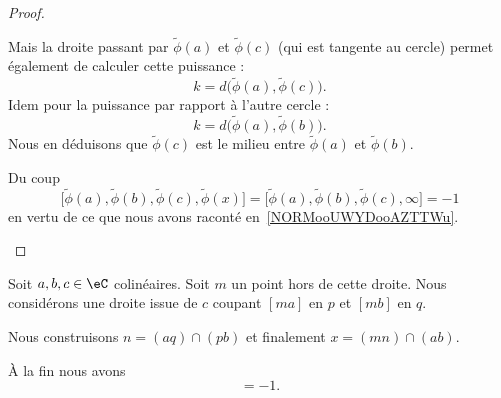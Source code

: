 \begin{proof}
\begin{subproof}
            Mais la droite passant par \( \tilde \phi(a)\) et \( \tilde \phi(c)\) (qui est tangente au cercle) permet également de calculer cette puissance :
            \begin{equation}
                k=d\big( \tilde \phi(a),\tilde \phi(c) \big).
            \end{equation}
            Idem pour la puissance par rapport à l'autre cercle :
            \begin{equation}
                k=d\big( \tilde \phi(a),\tilde \phi(b) \big).
            \end{equation}
            Nous en déduisons que \( \tilde \phi(c)\) est le milieu entre \( \tilde \phi(a)\) et \( \tilde \phi(b)\).

            Du coup
            \begin{equation}
                \big[ \tilde \phi(a),\tilde \phi(b), \tilde \phi(c),\tilde \phi(x) \big]=\big[ \tilde \phi(a),\tilde \phi(b), \tilde \phi(c), \infty \big]=-1
            \end{equation}
            en vertu de ce que nous avons raconté en~\ref{NORMooUWYDooAZTTWu}.

    \end{subproof}
\end{proof}

\begin{lemma}        \label{LEMooYBTHooABWkeo}
    Soit \( a,b,c\in \eC\) colinéaires. Soit \( m\) un point hors de cette droite. Nous considérons une droite issue de \( c\) coupant \( [ma]\) en \( p\) et \( [mb] \) en \( q\).

    Nous construisons \( n=(aq)\cap (pb)\) et finalement \( x=(mn)\cap (ab)\).

    À la fin nous avons
    \begin{equation}
        [a,b,c,x]=-1.
    \end{equation}
\end{lemma}

